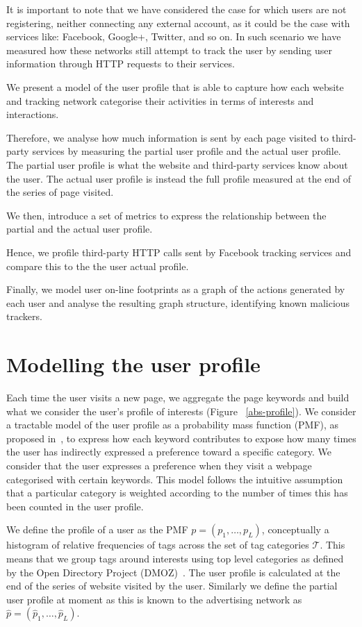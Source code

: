 It is important to note that we have considered the case for which users are not registering, neither connecting any external account, as it could be the case with services like: Facebook, Google+, Twitter, and so on. In such scenario we have measured how these networks still attempt to track the user by sending user information through HTTP requests to their services.

We present a model of the user profile that is able to capture how each website and tracking network categorise their activities in terms of interests and interactions. 

Therefore, we analyse how much information is sent by each page visited to third-party services by measuring the partial user profile and the actual user profile. The partial user profile is what the website and third-party services know about the user. The actual user profile is instead the full profile measured at the end of the series of page visited.

We then, introduce a set of metrics to express the relationship between the partial and the actual user profile.

Hence, we profile third-party HTTP calls sent by Facebook tracking services and compare this to the the user actual profile.

Finally, we model user on-line footprints as a graph of the actions generated by each user and analyse the resulting graph structure, identifying known malicious trackers.

\section{Modelling the user profile}
\label{sec:mod-profile}
Each time the user visits a new page, we aggregate the page keywords and build what we consider the user's profile of interests (Figure ~\ref{abs-profile}). We consider a tractable model of the user profile as a probability mass function (PMF), as proposed in~\cite{Parra12DKE,Parra12TKDE}, to express how each keyword contributes to expose how many times the user has indirectly expressed a preference toward a specific category. We consider that the user expresses a preference when they visit a webpage categorised with certain keywords. This model follows the intuitive assumption that a particular category is weighted according to the number of times this has been counted in the user profile.

We define the profile of a user as the PMF $p = (p_1,\ldots, p_L)$, conceptually a histogram of relative frequencies of tags across the set of tag categories $\mathcal{T}$. This means that we group tags around interests using top level categories as defined by the Open Directory Project (DMOZ)~\cite{a22}.
The user profile is calculated at the end of the series of website visited by the user. Similarly we define the partial user profile at moment as this is known to the advertising network as  $\hat{p} = (\hat{p}_1,\ldots, \hat{p}_L)$. 

